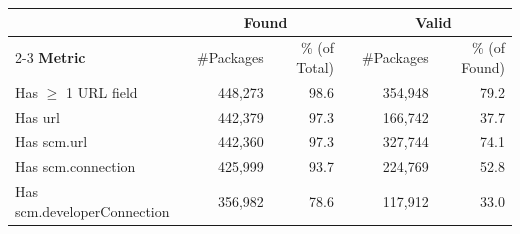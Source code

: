 \small
\begin{tabular}{@{}lrrcrr@{}}
    \toprule
    & \multicolumn{2}{c}{\bf Found} && \multicolumn{2}{c}{\bf Valid} \\
    \cmidrule{2-3} \cmidrule{5-6}
    {\bf Metric} & \#Packages & \% (of Total) && \#Packages & \% (of Found) \\ 
    \midrule
    Has $\geq$ 1 URL field & 448,273 & 98.6 && 354,948 & 79.2 \\ 
    Has url & 442,379 & 97.3 && 166,742 & 37.7 \\  %
    Has scm.url & 442,360 & 97.3 && 327,744 & 74.1 \\ 
    Has scm.connection & 425,999 & 93.7 && 224,769 & 52.8 \\ 
    Has scm.developerConnection & 356,982 & 78.6 && 117,912 & 33.0 \\ 
    \bottomrule
\end{tabular}